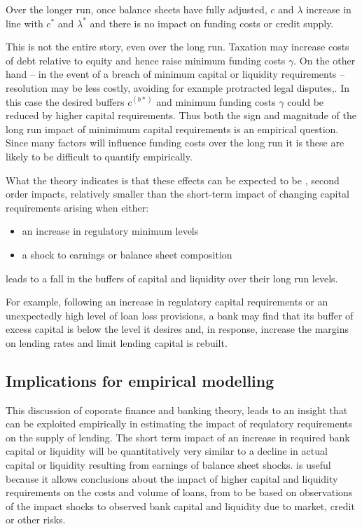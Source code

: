 \documentclass[
]{article}
\begin{document}
Over the longer run, once balance sheets have fully adjusted, \(c\) and \(\lambda\) increase in line with \(c^\ast\) and \(\lambda^\ast\) and there is no impact on funding costs or credit supply.

This is not the entire story, even over the long run. Taxation may increase costs of debt relative to equity and hence raise minimum funding costs \(\gamma\). On the other hand -- in the event of a breach of minimum capital or liquidity requirements -- resolution may be less costly, avoiding for example protracted legal disputes,. In this case the desired buffers \(c^(b*)\) and minimum funding costs \(\gamma\) could be reduced by higher capital requirements. Thus both the sign and magnitude of the long run impact of minimimum capital requirements is an empirical question. Since many factors will influence funding costs over the long run it is these are likely to be difficult to quantify empirically.

What the theory indicates is that these effects can be expected to be , second order impacts, relatively smaller than the short-term impact of changing capital requirements arising when either:

\begin{itemize}
    \item an increase in regulatory minimum levels
    \item a shock to earnings or balance sheet composition
\end{itemize}

leads to a fall in the buffers of capital and liquidity over their long run levels.

For example, following an increase in regulatory capital requirements or an unexpectedly high level of loan loss provisions, a bank may find that its buffer of excess capital is below the level it desires and, in response, increase the margins on lending rates and limit lending capital is rebuilt.

\hypertarget{implications-for-empirical-modelling-1}{%
\subsection{Implications for empirical modelling}\label{implications-for-empirical-modelling-1}}

This discussion of coporate finance and banking theory, leads to an insight that can be exploited empirically in estimating the impact of requlatory requirements on the supply of lending. The short term impact of an increase in required bank capital or liquidity will be quantitatively very similar to a decline in actual capital or liquidity resulting from earnings of balance sheet shocks. is useful because it allows conclusions about the impact of higher capital and liquidity requirements on the costs and volume of loans, from to be based on observations of the impact shocks to observed bank capital and liquidity due to market, credit or other risks.
\end{document}
